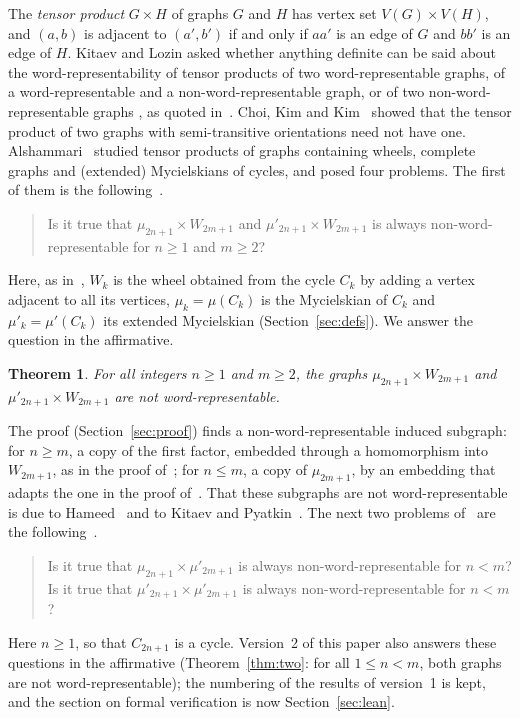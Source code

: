 \documentclass[11pt]{article}
\newtheorem{theorem}{Theorem}
\theoremstyle{remark}
\begin{document}
The \emph{tensor product} $G\times H$ of graphs $G$ and $H$ has vertex set
$V(G)\times V(H)$, and $(a,b)$ is adjacent to $(a',b')$ if and only if $aa'$
is an edge of $G$ and $bb'$ is an edge of $H$. Kitaev and Lozin asked whether
anything definite can be said about the word-representability of tensor
products of two word-representable graphs, of a word-representable and a
non-word-representable graph, or of two non-word-representable graphs
\cite[Problem~7.2.5]{kl}, as quoted in~\cite[Problem~1.1]{alsh}. Choi, Kim and
Kim~\cite{ckk} showed that the tensor product of two graphs with
semi-transitive orientations need not have one. Alshammari~\cite{alsh}
studied tensor products of graphs containing wheels, complete graphs and
(extended) Mycielskians of cycles, and posed four problems. The first of them
is the following~\cite[Problem~5.1]{alsh}.

\begin{quote}
Is it true that $\mu_{2n+1}\times W_{2m+1}$ and $\mu'_{2n+1}\times
W_{2m+1}$ is always non-word-representable for $n\ge1$ and $m\ge2$?
\end{quote}

Here, as in~\cite{alsh}, $W_k$ is the wheel obtained from the cycle $C_k$ by
adding a vertex adjacent to all its vertices, $\mu_k=\mu(C_k)$ is the
Mycielskian of $C_k$ and $\mu'_k=\mu'(C_k)$ its extended Mycielskian
(Section~\ref{sec:defs}). We answer the question in the affirmative.

\begin{theorem}\label{thm:main}
For all integers $n\ge1$ and $m\ge2$, the graphs $\mu_{2n+1}\times W_{2m+1}$
and $\mu'_{2n+1}\times W_{2m+1}$ are not word-representable.
\end{theorem}

The proof (Section~\ref{sec:proof}) finds a non-word-representable induced
subgraph: for $n\ge m$, a copy of the first factor, embedded through a
homomorphism into $W_{2m+1}$, as in the proof
of~\cite[Theorem~3.6]{alsh}; for $n\le m$, a copy of $\mu_{2m+1}$, by an
embedding that adapts the one in the proof of~\cite[Theorem~4.3]{alsh}. That
these subgraphs are not word-representable is due to Hameed~\cite{hameed} and
to Kitaev and Pyatkin~\cite{kp}. The next two problems of~\cite{alsh} are the following~\cite[Problems~5.2
and~5.3]{alsh}.

\begin{quote}
Is it true that $\mu_{2n+1}\times\mu'_{2m+1}$ is always non-word-representable
for $n<m$?\\
Is it true that $\mu'_{2n+1}\times\mu'_{2m+1}$ is always non-word-representable
for $n<m$?
\end{quote}
Here $n\ge1$, so that $C_{2n+1}$ is a cycle. Version~2 of this paper also
answers these questions in the affirmative (Theorem~\ref{thm:two}: for all
$1\le n<m$, both graphs are not word-representable); the numbering of
the results of version~1 is kept, and the section on formal verification is now
Section~\ref{sec:lean}.
\end{document}
